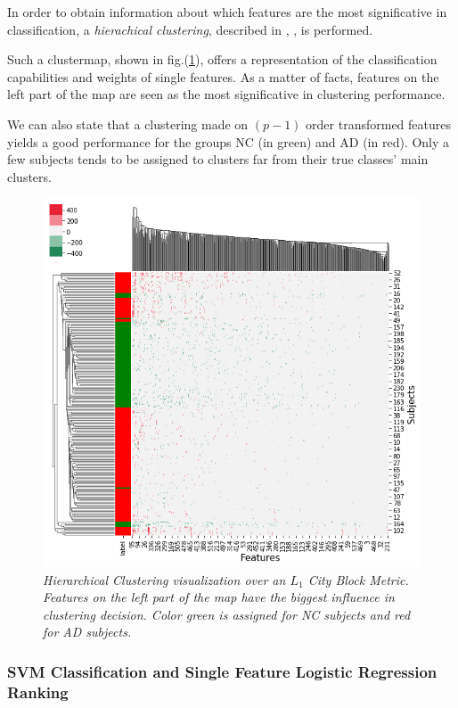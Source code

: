 \documentclass[12pt,openright,twoside,a4paper]{book}
\begin{document}
In order to obtain information about which features are the most significative in classification, a \textit{hierachical clustering}, described in \cite{cluster}, \cite{cluster2},  is performed.

Such a clustermap, shown in fig.(\ref{ADNI-cluster}), offers a representation of the classification capabilities and weights of single features.
As a matter of facts, features on the left part of the map are seen as the most significative in clustering performance.

We can also state that a clustering made on $(p-1)$ order transformed features yields a good performance for the groups NC (in green) and AD (in red). Only a few subjects tends to be assigned to clusters far from their true classes' main clusters.

\begin{figure}[!h]
\centering
\includegraphics[scale=0.5]{diff-logpdf-clustering10}
\caption{\textit{Hierarchical Clustering visualization over an $L_1$ City Block Metric. Features on the left part of the map have the biggest influence in clustering decision. Color green is assigned for NC subjects and red for AD subjects.}}
\label{ADNI-cluster}
\end{figure}

\subsubsection*{SVM Classification and Single Feature Logistic Regression Ranking}
\end{document}
